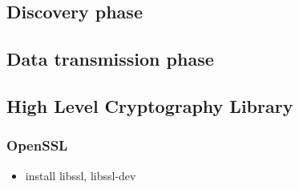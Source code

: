 \subsection{Discovery phase}

\subsection{Data transmission phase}


\subsection{High Level Cryptography Library}

\subsubsection{OpenSSL}

\begin{itemize}
 \item install libssl, libssl-dev
\end{itemize}

